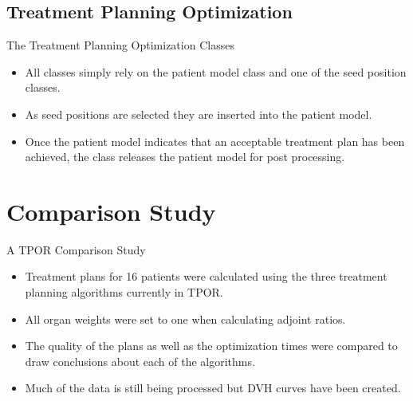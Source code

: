 \documentclass{beamer}
\begin{document}
\subsection{Treatment Planning Optimization}
\begin{frame}{The Treatment Planning Optimization Classes}

  \begin{itemize}
    \item All classes simply rely on the patient model class and one of the
      seed position classes.
      \medskip
    \item As seed positions are selected they are inserted into the patient
      model.
      \medskip
    \item Once the patient model indicates that an acceptable treatment plan
      has been achieved, the class releases the patient model for post 
      processing.
  \end{itemize}
  
\end{frame}

\section{Comparison Study}
\begin{frame}{A TPOR Comparison Study}
  
  \begin{itemize}
    \item Treatment plans for 16 patients were calculated using the three
      treatment planning algorithms currently in TPOR.
      \medskip
    \item All organ weights were set to one when calculating adjoint ratios.
      \medskip
    \item The quality of the plans as well as the optimization times were
      compared to draw conclusions about each of the algorithms.
      \medskip
    \item Much of the data is still being processed but DVH curves have been
      created.
  \end{itemize}

\end{frame}
\end{document}

